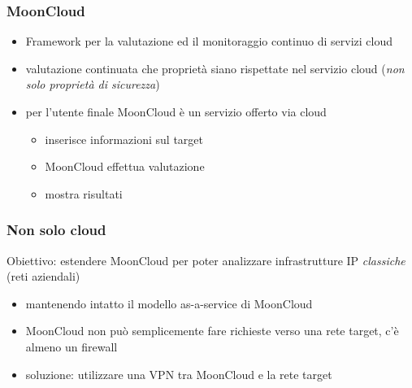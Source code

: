 \begin{frame}
    \frametitle{MoonCloud}
    \begin{itemize}
        \item Framework per la \alert{valutazione}
        ed il \alert{monitoraggio continuo} di servizi
        cloud
        \item valutazione continuata che
        \alert{proprietà} siano rispettate nel servizio cloud
        (\textit{non solo proprietà di sicurezza})
        \item per l'utente finale MoonCloud è un \alert{servizio}
        offerto via cloud
        \begin{itemize}
            \item inserisce informazioni sul target
            \item MoonCloud effettua valutazione
            \item mostra risultati
        \end{itemize}
    \end{itemize}
\end{frame}

\begin{frame}
    \frametitle{Non solo cloud}
    \alert{Obiettivo}: estendere MoonCloud per poter analizzare
    infrastrutture IP \textit{classiche} (reti aziendali)

        \begin{itemize}
            \item mantenendo intatto il modello \alert{as-a-service} di
            MoonCloud
            \item MoonCloud non può semplicemente fare richieste verso
            una rete target, c'è almeno un firewall
            \item soluzione: utilizzare una \alert{VPN} tra MoonCloud e la rete target
        \end{itemize}
\end{frame}

